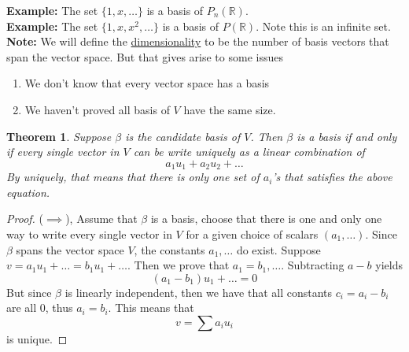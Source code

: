 \documentclass{article}
\newtheorem{theorem}{Theorem}[section]
\newtheorem{one minute paper}[theorem]{One Minute Paper}
\begin{document}
\textbf{Example:} The set $\{1,x,\dots\}$ is a basis of $P_n(\mathbb{R})$.  \\

\textbf{Example:} The set $\{1,x,x^2,\dots\}$ is a basis of $P(\mathbb{R})$. Note this is an infinite set. \\

\textbf{Note:} We will define the \underline{dimensionality} to be the number of basis vectors that span the vector space. But that gives arise to some issues
\begin{enumerate}
    \item We don't know that every vector space has a basis
    \item We haven't proved all basis of $V$ have the same size.
\end{enumerate}

\begin{theorem}
    Suppose $\beta$ is the candidate basis of $V$. Then $\beta$ is a basis if and only if every single vector in 
    $V$ can be write uniquely as a linear combination of 
    \begin{equation}
        a_1u_1 + a_2u_2 + \dots
    \end{equation}
    By uniquely, that means that there is only one set of $a_i$'s that satisfies the above equation. 
\end{theorem}

\begin{proof}
    ($\implies$), Assume that $\beta$ is a basis, choose that there is one and only one way to write every single vector in $V$ for a given choice of scalars $(a_1, \dots)$.
    Since $\beta$ spans the vector space $V$, the constants $a_1, \dots$ do exist. Suppose $v = a_1u_1 + \dots = b_1u_1 + \dots$. Then we prove that $a_1 = b_1, \dots$. Subtracting $a - b$ yields
    \begin{equation}
        (a_1 - b_1)u_1 + \dots = 0
    \end{equation} 
    But since $\beta$ is linearly independent, then we have that all constants $c_i = a_i - b_i$ are all 0, thus $a_i = b_i$. This means that 
    \begin{equation}
        v = \sum a_iu_i
    \end{equation}
    is unique. 
\end{proof}
\end{document}
